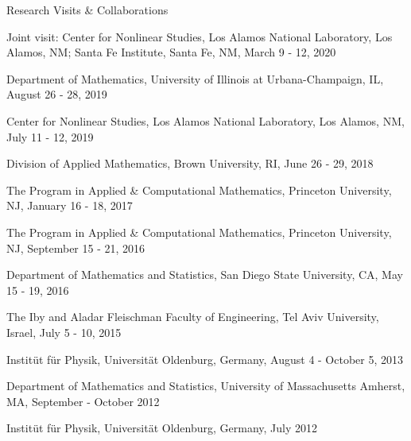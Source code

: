 \documentclass[10pt]{article} %
\newenvironment{innerlist}[1][\enskip\textbullet]%
        {\begin{compactitem}[#1]}{\end{compactitem}}
\begin{document}
\begin{section}{Research Visits \& Collaborations}
\begin{innerlist}
\item Joint visit: Center for Nonlinear Studies, Los Alamos National Laboratory, Los Alamos, NM;
Santa Fe Institute, Santa Fe, NM, March 9 - 12, 2020
\item Department of Mathematics, University of Illinois at Urbana-Champaign, IL, August 26 - 28, 2019
\item Center for Nonlinear Studies, Los Alamos National Laboratory, Los Alamos, NM, July 11 - 12, 2019
\item Division of Applied Mathematics, Brown University, RI, June 26 - 29, 2018
\item The Program in Applied \& Computational Mathematics, Princeton University, NJ, January 16 - 18, 2017
\item The Program in Applied \& Computational Mathematics, Princeton University, NJ, September 15 - 21, 2016
\item Department of Mathematics and Statistics, San Diego State University, CA, May 15 - 19, 2016
\item The Iby and Aladar Fleischman Faculty of Engineering, Tel Aviv University, Israel, July 5 - 10, 2015
\item Instit\"ut f\"ur Physik, Universit\"at Oldenburg, Germany, August 4 - October 5, 2013
\item Department of Mathematics and Statistics, University of Massachusetts Amherst, MA, September - October 2012
\item Instit\"ut f\"ur Physik, Universit\"at Oldenburg, Germany, July 2012
\end{innerlist}

\end{section}
\end{document}
